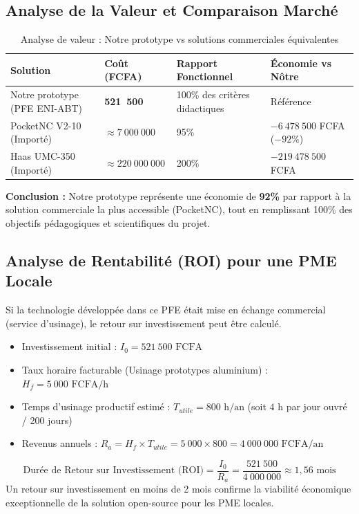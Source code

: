 \subsection{Analyse de la Valeur et Comparaison Marché}
\begin{table}[htbp]
\centering
\renewcommand{\arraystretch}{1.3}
\begin{tabular}{|p{4cm}|p{2.2cm}|p{3.2cm}|p{3.8cm}|}
\hline
\rowcolor{macouleur!20}
\textbf{Solution} & \textbf{Coût (FCFA)} & \textbf{Rapport Fonctionnel} & \textbf{Économie vs Nôtre} \\
\hline
Notre prototype (PFE ENI-ABT) & \textbf{521~500} & 100\% des critères didactiques & Référence \\
\hline
PocketNC V2-10 (Importé) & $\approx 7~000~000$ & 95\% & $-6~478~500$ FCFA ($-92\%$) \\
\hline
Haas UMC-350 (Importé) & $\approx 220~000~000$ & 200\% & $-219~478~500$ FCFA \\
\hline
\end{tabular}
\caption{Analyse de valeur : Notre prototype vs solutions commerciales équivalentes}
\label{tab:analyse_valeur}
\end{table}

\textbf{Conclusion :} Notre prototype représente une économie de \textbf{92\%} par rapport à la solution commerciale la plus accessible (PocketNC), tout en remplissant 100\%  des objectifs pédagogiques et scientifiques du projet.

\subsection{Analyse de Rentabilité (ROI) pour une PME Locale}
Si la technologie développée dans ce PFE était mise en échange commercial (service d'usinage), le retour sur investissement peut être calculé.
\begin{itemize}
    \item Investissement initial : $I_0 = 521~500 \text{ FCFA}$
    \item Taux horaire facturable (Usinage prototypes aluminium) : $H_f = 5~000 \text{ FCFA/h}$
    \item Temps d'usinage productif estimé : $T_{utile} = 800 \text{ h/an}$ (soit $4\text{ h}$ par jour ouvré / 200 jours)
    \item Revenus annuels : $R_a = H_f \times T_{utile} = 5~000 \times 800 = 4~000~000 \text{ FCFA/an}$
\end{itemize}
\begin{equation}
    \text{Durée de Retour sur Investissement (ROI)} = \frac{I_0}{R_a} = \frac{521~500}{4~000~000} \approx \boxed{1{,}56\text{ mois}}
\end{equation}
Un retour sur investissement en moins de 2 mois confirme la viabilité économique exceptionnelle de la solution open-source pour les PME locales.

